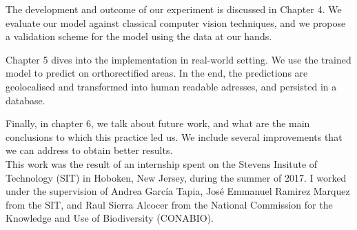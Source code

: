 The development and outcome of our experiment is discussed in Chapter 4. We evaluate our model against classical computer vision techniques, and we propose a validation scheme for the model using the data at our hands.

Chapter 5 dives into the implementation in real-world setting. We use the trained model to predict on orthorectified areas. In the end, the predictions are geolocalised and transformed into human readable adresses, and persisted in a database.

Finally, in chapter 6, we talk about future work, and what are the main conclusions to which this practice led us. We include several improvements that we can address to obtain better results.\\

This work was the result of an internship spent on the Stevens Insitute of Technology (SIT) in Hoboken, New Jersey, during the summer of 2017. I worked under the supervision of Andrea Garc\'ia Tapia, Jos\'e Emmanuel Ramirez Marquez from the SIT, and Raul Sierra Alcocer from the National Commission for the Knowledge and Use of Biodiversity (CONABIO).\\